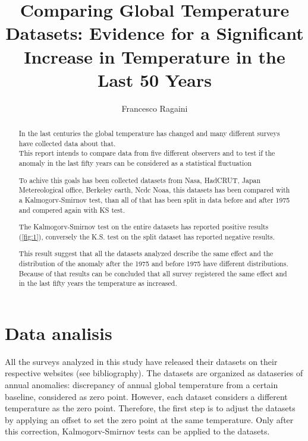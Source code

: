 \documentclass[a4paper,11pt,rmp,superscriptaddress]{revtex4}
\begin{document}
\title{Comparing Global Temperature Datasets: Evidence for a Significant Increase in Temperature in the Last 50 Years}
\author{Francesco Ragaini}
\begin{abstract}

In the last centuries the global temperature has changed and many different surveys have collected data about that.\\
This report intends to compare data from five different observers and to test if the anomaly in the last fifty years can be considered as a statistical fluctuation

To achive this goals has been collected datasets from Nasa, HadCRUT, Japan Metereological office, Berkeley earth, Ncdc Noaa, 
this datasets has been compared with a Kalmogorv-Smirnov test, than all of that has been split in data before and after 1975 and compered 
again with KS test.

The Kalmogorv-Smirnov test on the entire datasets has reported positive results (\ref*{fig:1}), conversely the K.S. test 
on the split dataset has reported negative results.

This result suggest that all the datasets analyzed describe the same effect and the distribution of the anomaly after the 1975 and 
before 1975 have different distributions. Because of that results can be concluded that all survey registered the same effect
and in the last fifty years the temperature as increased.
\end{abstract}

\maketitle
\section*{Data analisis}
All the surveys analyzed in this study have released their datasets on their respective websites (see bibliography). 
The datasets are organized as dataseries of annual anomalies: discrepancy of annual global temperature from a certain baseline, considered
 as zero point.
However, each dataset considers a different temperature as the zero point. Therefore, 
the first step is to adjust the datasets by applying an offset to set the zero point at the same temperature. 
Only after this correction, Kalmogorv-Smirnov tests can be applied to the datasets.
\end{document}
